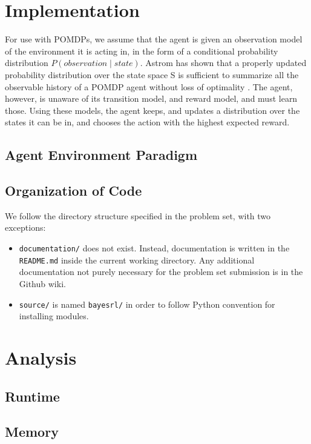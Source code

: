 \documentclass{pset}
\begin{document}
\section{Implementation}
For use with POMDPs, we assume that the agent is given an observation model of the
environment it is acting in, in the form of a conditional probability distribution
$P(observation \mid state)$. Astrom has shown that a properly updated probability 
distribution over the state space S is sufficient to summarize all the observable 
history of a POMDP agent without loss of optimality \cite{astrom}. The agent, however, is unaware of its transition model, and
reward model, and must learn those. Using these models, the agent keeps, and
updates a distribution over the states it can be in, and chooses the action with
the highest expected reward.


\subsection{Agent Environment Paradigm}

\subsection{Organization of Code}
We follow the directory structure specified in the problem set, with two
exceptions:
\begin{itemize}
\item \texttt{documentation/} does not exist. Instead, documentation is written
in the \texttt{README.md} inside the current working directory. Any additional
documentation not purely necessary for the problem set submission is in the
Github wiki.
\item \texttt{source/} is named \texttt{bayesrl/} in order to follow Python
convention for installing modules.
\end{itemize}

\section{Analysis}

\subsection{Runtime}

\subsection{Memory}
\end{document}
